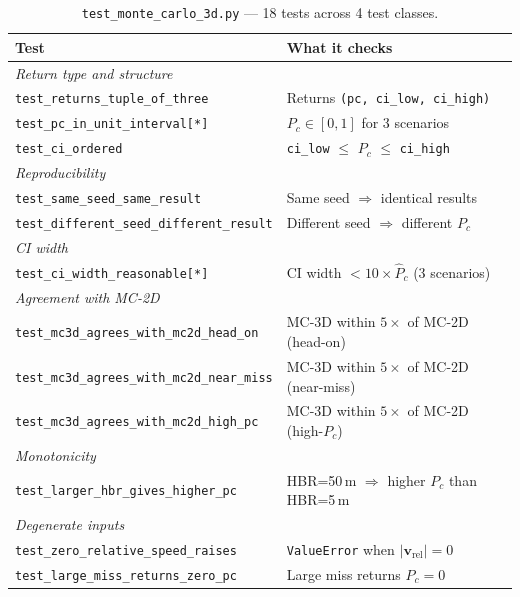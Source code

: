 \documentclass[11pt]{article}
\begin{document}
\begin{table}[htb]
\centering
\small
\caption{\texttt{test\_monte\_carlo\_3d.py} — 18 tests across 4 test classes.}
\label{tab:test_mc3d}
\begin{tabular}{lp{10cm}}
  \toprule
  Test & What it checks \\
  \midrule
  \multicolumn{2}{l}{\textit{Return type and structure}} \\
  \texttt{test\_returns\_tuple\_of\_three} & Returns \texttt{(pc, ci\_low, ci\_high)} \\
  \texttt{test\_pc\_in\_unit\_interval[*]} & $P_c \in [0,1]$ for 3 scenarios \\
  \texttt{test\_ci\_ordered} & \texttt{ci\_low} $\le$ $P_c$ $\le$ \texttt{ci\_high} \\
  \midrule
  \multicolumn{2}{l}{\textit{Reproducibility}} \\
  \texttt{test\_same\_seed\_same\_result} & Same seed $\Rightarrow$ identical results \\
  \texttt{test\_different\_seed\_different\_result} & Different seed $\Rightarrow$ different $P_c$ \\
  \midrule
  \multicolumn{2}{l}{\textit{CI width}} \\
  \texttt{test\_ci\_width\_reasonable[*]} & CI width $< 10 \times \hat{P}_c$ (3 scenarios) \\
  \midrule
  \multicolumn{2}{l}{\textit{Agreement with MC-2D}} \\
  \texttt{test\_mc3d\_agrees\_with\_mc2d\_head\_on} & MC-3D within $5\times$ of MC-2D (head-on) \\
  \texttt{test\_mc3d\_agrees\_with\_mc2d\_near\_miss} & MC-3D within $5\times$ of MC-2D (near-miss) \\
  \texttt{test\_mc3d\_agrees\_with\_mc2d\_high\_pc} & MC-3D within $5\times$ of MC-2D (high-$P_c$) \\
  \midrule
  \multicolumn{2}{l}{\textit{Monotonicity}} \\
  \texttt{test\_larger\_hbr\_gives\_higher\_pc} & HBR=50\,m $\Rightarrow$ higher $P_c$ than HBR=5\,m \\
  \midrule
  \multicolumn{2}{l}{\textit{Degenerate inputs}} \\
  \texttt{test\_zero\_relative\_speed\_raises} & \texttt{ValueError} when $|\mathbf{v}_\text{rel}|=0$ \\
  \texttt{test\_large\_miss\_returns\_zero\_pc} & Large miss returns $P_c = 0$ \\
  \bottomrule
\end{tabular}
\end{table}
\end{document}
